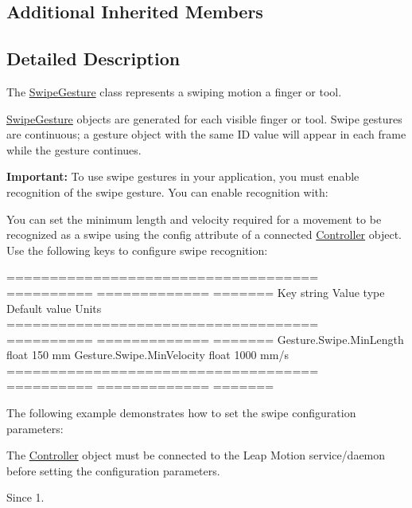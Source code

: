 \subsection*{Additional Inherited Members}


\subsection{Detailed Description}
The \hyperlink{class_leap_1_1_swipe_gesture}{Swipe\+Gesture} class represents a swiping motion a finger or tool.



\hyperlink{class_leap_1_1_swipe_gesture}{Swipe\+Gesture} objects are generated for each visible finger or tool. Swipe gestures are continuous; a gesture object with the same ID value will appear in each frame while the gesture continues.

{\bfseries Important\+:} To use swipe gestures in your application, you must enable recognition of the swipe gesture. You can enable recognition with\+:


\begin{DoxyCodeInclude}
\end{DoxyCodeInclude}


You can set the minimum length and velocity required for a movement to be recognized as a swipe using the config attribute of a connected \hyperlink{class_leap_1_1_controller}{Controller} object. Use the following keys to configure swipe recognition\+:

==================================== ========== ============= ======= Key string Value type Default value Units ==================================== ========== ============= ======= Gesture.\+Swipe.\+Min\+Length float 150 mm Gesture.\+Swipe.\+Min\+Velocity float 1000 mm/s ==================================== ========== ============= ======= 

The following example demonstrates how to set the swipe configuration parameters\+:


\begin{DoxyCodeInclude}
\end{DoxyCodeInclude}


The \hyperlink{class_leap_1_1_controller}{Controller} object must be connected to the Leap Motion service/daemon before setting the configuration parameters.

\begin{DoxySince}{Since}
1. 
\end{DoxySince}


